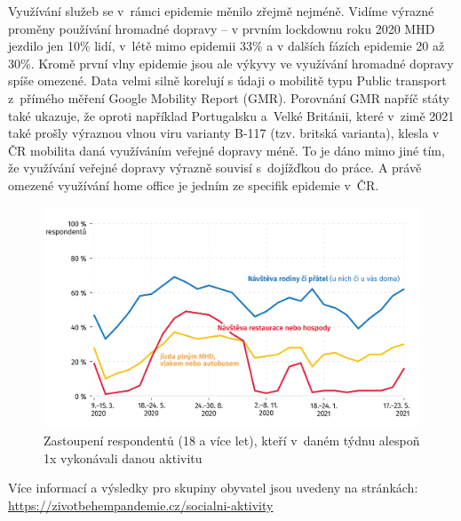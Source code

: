 Využívání služeb se v rámci epidemie měnilo zřejmě nejméně. Vidíme výrazné proměny používání hromadné dopravy – v prvním lockdownu roku 2020 MHD jezdilo jen 10\% lidí, v létě mimo epidemii 33\% a v dalších fázích epidemie 20 až 30\%. Kromě první vlny epidemie jsou ale výkyvy ve využívání hromadné dopravy spíše omezené. Data velmi silně korelují s údaji o mobilitě typu Public transport z přímého měření Google Mobility Report (GMR). Porovnání GMR napříč státy také ukazuje, že oproti například Portugalsku a Velké Británii, které v zimě 2021 také prošly výraznou vlnou viru varianty B-117 (tzv. britská varianta), klesla v ČR mobilita daná využíváním veřejné dopravy méně. To je dáno mimo jiné tím, že využívání veřejné dopravy výrazně souvisí s dojížďkou do práce. A právě omezené využívání home office je jedním ze specifik epidemie v ČR.

\begin{figure}[ht]
    \centering
    \includegraphics[width=\textwidth]{./pic/zbp-graf3.png}
    \caption{Zastoupení respondentů (18 a více let), kteří v daném týdnu alespoň 1x vykonávali danou aktivitu}
    \label{fig:zbp3}
\end{figure}


Více informací a výsledky pro skupiny obyvatel jsou uvedeny na stránkách: \url{https://zivotbehempandemie.cz/socialni-aktivity}



